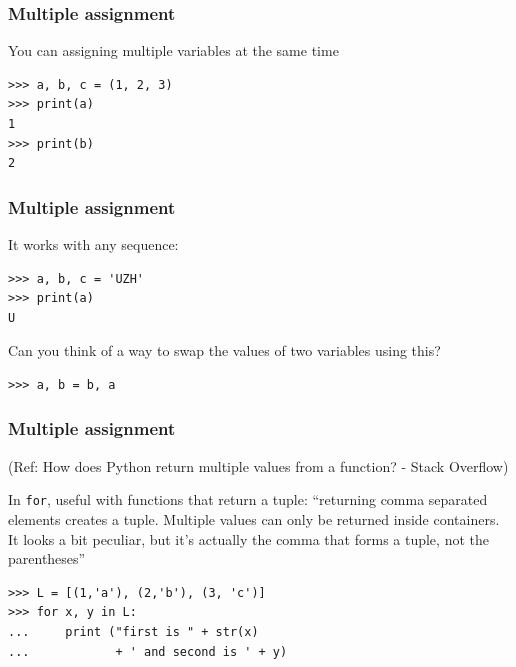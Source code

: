 \begin{frame}[fragile]
\frametitle{Multiple assignment}
You can assigning multiple variables at the same time
\begin{lstlisting}
>>> a, b, c = (1, 2, 3)
>>> print(a)
1
>>> print(b)
2
\end{lstlisting}
\end{frame}



\begin{frame}[fragile]
\frametitle{Multiple assignment}
It works with any sequence:

\begin{lstlisting}
>>> a, b, c = 'UZH'
>>> print(a)
U
\end{lstlisting}



  Can you think of a way to swap the values of two variables using this?


\begin{lstlisting}
>>> a, b = b, a
\end{lstlisting}
\end{frame}


\begin{frame}[fragile]\frametitle{Multiple assignment}
\tiny{(Ref: How does Python return multiple values from a function? - Stack Overflow)}

In \texttt{for}, useful with functions that return a tuple: ``returning comma separated elements creates a tuple. Multiple values can only be returned inside containers. It looks a bit peculiar, but it's actually the comma that forms a tuple, not the parentheses''
\begin{lstlisting}
>>> L = [(1,'a'), (2,'b'), (3, 'c')]
>>> for x, y in L:
...     print ("first is " + str(x)
...            + ' and second is ' + y)
\end{lstlisting}
\end{frame}

